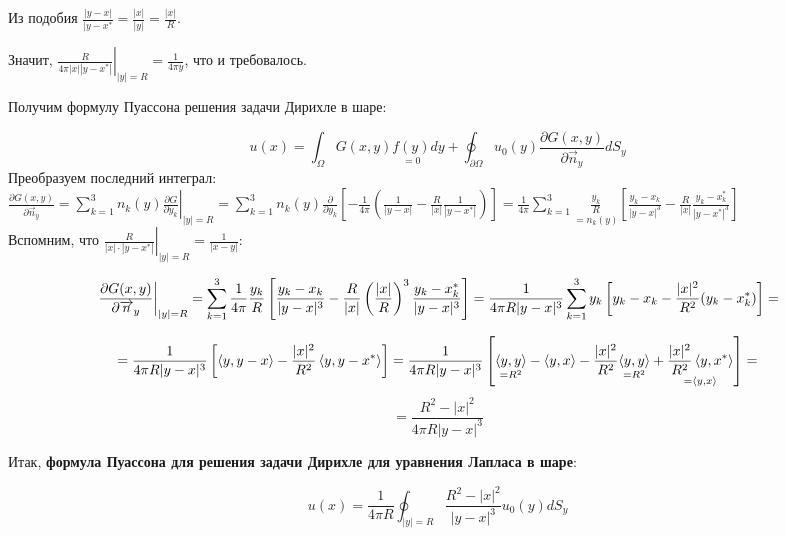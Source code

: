 Из подобия $\frac{|y-x|}{|y-x^*} = \frac{|x|}{|y|} = \frac{|x|}{R}$.

Значит, $\left.\frac{R}{4 \pi |x| |y-x^*|} \right|_{|y|=R} = \frac{1}{4 \pi y}$, что и требовалось.


Получим формулу Пуассона решения задачи Дирихле в шаре:

$$u(x) = \int_{\Omega}{G(x,y) \underset{=0}{f(y)} dy} +
\oint_{\partial \Omega}{u_0(y) \frac{\partial G(x,y)}
{\partial \overrightarrow{n}_y}dS_y}
$$
Преобразуем последний интеграл:\\

$
\frac{\partial G(x,y)}{\partial \overrightarrow{n}_y}=
\sum_{k=1}^{3}{n_k(y) \left. \frac{\partial G}{\partial y_k} \right|_{|y|=R}}=
\sum_{k=1}^{3}{n_k(y)\frac{\partial}{\partial y_k}\left[
-\frac{1}{4\pi}\left(\frac{1}{|y-x|}-\frac{R}{|x|}\frac{1}{|y-x^*|}\right)
\right]} 
=
\frac{1}{4 \pi}  \sum_{k=1}^{3}\underset{=n_k(y)}{\frac{y_k}{R}}\left[ \frac{y_k-x_k}{|y-x|^3} - \frac{R}{|x|}  \frac{y_k-x_k^*}{|y-x^*|^3} \right]
$\\

Вспомним, что $\left.\frac{R}{|x|\cdot|y-x^*|}\right|_{|y|=R} =
\frac{1}{|x-y|}$:

$$
\left. \frac{\partial G(x,y)}{\partial \overrightarrow{n}_y} \right|_{|y|=R} 
=
\sum_{k=1}^{3}{\frac{1}{4 \pi} \frac{y_k}{R}
\left[ \frac{y_k-x_k}{|y-x|^3} -\frac{R}{|x|}\left(\frac{|x|}{R}\right)^3
\frac{y_k - x_k^*}{|y-x|^3} \right] }
=
\frac{1}{4 \pi R |y-x|^3} \sum_{k=1}^{3}{y_k \left[y_k-x_k-\frac{|x|^2}{R^2}(y_k - x_k^*)\right]}
=
$$

$$
=
\frac{1}{4 \pi R |y-x|^3} \left[\left\langle y,y-x \right\rangle - \frac{|x|^2}{R^2}
\left\langle y,y-x^* \right\rangle\right]
=
\frac{1}{4 \pi R |y-x|^3} \left[\underset{=R^2}{\left\langle y,y \right\rangle} - \left\langle y,x \right\rangle
-\frac{|x|^2}{R^2}\underset{=R^2}{\left\langle y,y \right\rangle}+ \underset{=\left\langle y,x \right\rangle}{\frac{|x|^2}{R^2} \left\langle y,x^* \right\rangle}  \right]
= $$ 
$$
=\frac{R^2 - |x|^2}{4 \pi R |y-x|^3}
$$

Итак, \textbf{формула Пуассона для решения задачи Дирихле для уравнения Лапласа в шаре}:

$$
u(x) = \frac{1}{4 \pi R} \oint_{|y|=R}{\frac{R^2-|x|^2}{|y-x|^3}u_0(y) dS_y}
$$


